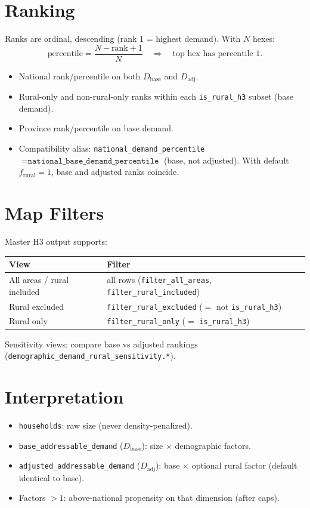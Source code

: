 \documentclass[10pt]{article}
\begin{document}
\section{Ranking}
Ranks are ordinal, descending (rank $1$ = highest demand). With $N$ hexes:
\[
\text{percentile}
=
\frac{N - \mathrm{rank} + 1}{N}
\quad\Rightarrow\quad
\text{top hex has percentile }1.
\]
\begin{itemize}
  \item National rank/percentile on both $D_{\text{base}}$ and $D_{\text{adj}}$.
  \item Rural-only and non-rural-only ranks within each \texttt{is\_rural\_h3} subset (base demand).
  \item Province rank/percentile on base demand.
  \item Compatibility alias: \texttt{national\_demand\_percentile} $=\texttt{national\_base\_demand\_percentile}$
        (base, not adjusted). With default $f_{\text{rural}}=1$, base and adjusted ranks coincide.
\end{itemize}

\section{Map Filters}
Master H3 output supports:
\begin{center}
\small
\begin{tabular}{@{}ll@{}}
\toprule
View & Filter \\
\midrule
All areas / rural included & all rows (\texttt{filter\_all\_areas}, \texttt{filter\_rural\_included}) \\
Rural excluded & \texttt{filter\_rural\_excluded} ($=$ not \texttt{is\_rural\_h3}) \\
Rural only & \texttt{filter\_rural\_only} ($=$ \texttt{is\_rural\_h3}) \\
\bottomrule
\end{tabular}
\end{center}
Sensitivity views: compare base vs adjusted rankings (\texttt{demographic\_demand\_rural\_sensitivity.*}).

\section{Interpretation}
\begin{itemize}
  \item \texttt{households}: raw size (never density-penalized).
  \item \texttt{base\_addressable\_demand} ($D_{\text{base}}$): size $\times$ demographic factors.
  \item \texttt{adjusted\_addressable\_demand} ($D_{\text{adj}}$): base $\times$ optional rural factor (default identical to base).
  \item Factors $>1$: above-national propensity on that dimension (after caps).
\end{itemize}
\end{document}
